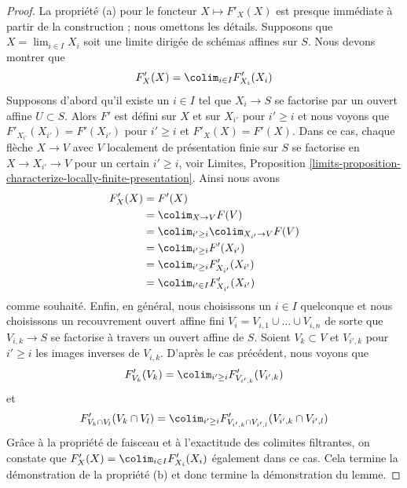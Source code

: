 \begin{proof}
\medskip\noindent
La propriété (a) pour le foncteur $X \mapsto F'_X(X)$ est presque immédiate à partir de la construction ; nous omettons les détails. Supposons que $X = \lim_{i \in I} X_i$ soit une limite dirigée de schémas affines sur $S$. Nous devons montrer que
$$
F'_X(X) = \colim_{i \in I} F'_{X_i}(X_i)
$$
Supposons d'abord qu'il existe un $i \in I$ tel que $X_i \to S$ se factorise par un ouvert affine $U \subset S$. Alors $F'$ est défini sur $X$ et sur $X_{i'}$ pour $i' \geq i$ et nous voyons que $F'_{X_{i'}}(X_{i'}) = F'(X_{i'})$ pour $i' \geq i$ et $F'_X(X) = F'(X)$. Dans ce cas, chaque flèche $X \to V$ avec $V$ localement de présentation finie sur $S$ se factorise en $X \to X_{i'} \to V$ pour un certain $i' \geq i$, voir Limites, Proposition \ref{limits-proposition-characterize-locally-finite-presentation}. Ainsi nous avons
\begin{align*}
F'_X(X)
& =
F'(X)  \\
& = \colim_{X \to V} F(V) \\
& =
\colim_{i' \geq i} \colim_{X_{i'} \to V} F(V) \\
& =
\colim_{i' \geq i} F'(X_{i'}) \\
& =
\colim_{i' \geq i} F'_{X_{i'}}(X_{i'}) \\
& =
\colim_{i' \in I} F'_{X_{i'}}(X_{i'})
\end{align*}
comme souhaité. Enfin, en général, nous choisissons un $i \in I$ quelconque et nous choisissons un recouvrement ouvert affine fini $V_i = V_{i, 1} \cup \ldots \cup V_{i, n}$ de sorte que $V_{i, k} \to S$ se factorise à travers un ouvert affine de $S$. Soient $V_k \subset V$ et $V_{i', k}$ pour $i' \geq i$ les images inverses de $V_{i, k}$. D'après le cas précédent, nous voyons que
$$
F'_{V_k}(V_k) = \colim_{i' \geq i} F'_{V_{i', k}}(V_{i', k})
$$
et
$$
F'_{V_k \cap V_l}(V_k \cap V_l) =
\colim_{i' \geq i}
F'_{V_{i', k} \cap V_{i', l}}(V_{i', k} \cap V_{i', l})
$$
Grâce à la propriété de faisceau et à l'exactitude des colimites filtrantes, on constate que $F'_X(X) = \colim_{i \in I} F'_{X_i}(X_i)$ également dans ce cas. Cela termine la démonstration de la propriété (b) et donc termine la démonstration du lemme.
\end{proof}


